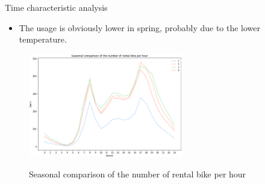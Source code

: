 \documentclass[
 size=14pt,
 paper=smartboard,  %
 mode=present, 		%
 display=slides, 	%
 style=tuliplab,  	%
 pauseslide,
 fleqn,leqno]{powerdot}
\begin{document}
\begin{slide}[toc=,bm=]{Time characteristic analysis}

\begin{itemize}
\item
The usage is obviously lower in spring,
probably due to the lower temperature. 
\end{itemize} 
    
\begin{figure}
  \centering
  \includegraphics[width=0.6\textwidth]{figures//season.eps}\\
  \caption{Seasonal comparison of the number of rental bike per hour} \label{framework}
\end{figure}
    
    
\end{slide}
\end{document}
